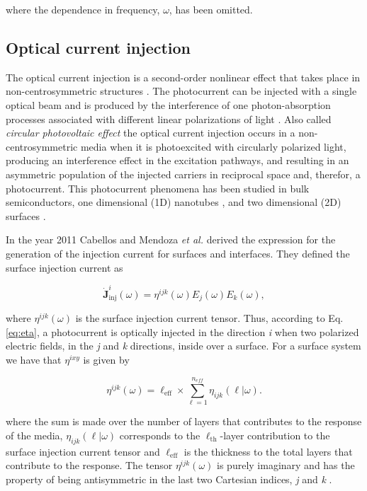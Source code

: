 \documentclass[aps,pra,11pt,tightenlines,showpacs,superscriptaddress,groupedaddress]{revtex4-1}
\newcommand{\ea}{$\eta^{ixy}$}
\begin{document}
\noindent where the dependence in frequency, $\omega$, has been omitted.

    \subsection{Optical current injection}

The optical current injection is a second-order nonlinear effect that takes place in non-centrosymmetric structures \cite{nastos2006optical,cabellos2011optical,bhat2005excitonic,fraser1999quantum}. The photocurrent can be injected with a single optical beam and is produced by the interference of one photon-absorption processes associated with different linear polarizations of light \cite{sipe2000second}. Also called  \emph{circular photovoltaic effect} the optical current injection occurs in a non-centrosymmetric media when it is photoexcited with circularly polarized light, producing an interference effect in the excitation pathways, and resulting in an asymmetric population of the injected carriers in reciprocal space and, therefor, a photocurrent. This photocurrent phenomena has been studied in bulk semiconductors, one dimensional (1D) nanotubes \cite{mele2000coherent,kral2000photogalvanic}, and two dimensional (2D) surfaces \cite{mele2000coherent}.

In the year 2011 Cabellos and Mendoza \emph{et al.} \cite{cabellos2011optical}  derived the expression for the generation of the injection current for surfaces and interfaces. They defined the surface injection current as 

\begin{equation}
    \mathbf{\dot{J}}^{i}_{\text{inj}}(\omega) = \eta^{ijk}(\omega)E_{j}(\omega)E_{k}(\omega), \label{eq:eta}   
\end{equation}

\noindent where $\eta^{ijk}(\omega)$ is the surface injection current tensor. Thus, according to Eq. \ref{eq:eta}, a photocurrent is optically injected in the direction \emph{i} when two polarized electric fields, in the \emph{j} and \emph{k} directions, inside over a surface. For a surface system we have that {\ea} is given by \cite{cabellos2011optical, arzate2014optical} 

\begin{equation}
    \eta^{ijk} (\omega) = \ell_{\text{eff}} \times \sum_{\ell=1}^{n_{eff}} \eta_{ijk} (\ell|\omega). \label{eq:etaeff}
\end{equation}

\noindent where the sum is made over the number of layers that contributes to the response of the media, $\eta_{ijk} (\ell|\omega)$ corresponds to the $\ell_{\text{th}}$-layer contribution to the surface injection current tensor and $\ell_{\text{eff}}$ is the thickness to the total layers that contribute to the response. The tensor $\eta^{ijk}(\omega)$ is purely imaginary and has the property of being antisymmetric in the last two Cartesian indices, \emph{j} and \emph{k} \cite{sipe2000second,nastos2006optical}. 
\end{document}
